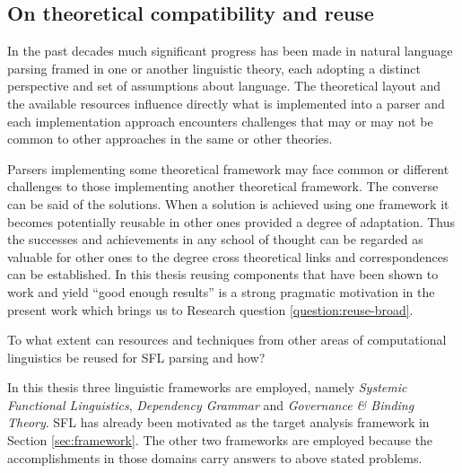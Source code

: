 
\subsection{On theoretical compatibility and reuse}
\label{sec:reuse}
In the past decades much significant progress has been made in natural language parsing framed in one or another linguistic theory, each adopting a distinct perspective and set of assumptions about language. The theoretical layout and the available resources influence directly what is implemented into a parser and each implementation approach encounters challenges that may or may not be common to other approaches in the same or other theories. 

Parsers implementing some theoretical framework may face common or different challenges to those implementing another theoretical framework. The converse can be said of the solutions. When a solution is achieved using one framework it becomes potentially reusable in other ones provided a degree of adaptation. Thus the successes and achievements in any school of thought can be regarded as valuable for other ones to the degree cross theoretical links and correspondences can be established. In this thesis reusing components that have been shown to work and yield ``good enough results'' is a strong pragmatic motivation in the present work which brings us to Research question \ref{question:reuse-broad}.

\begin{question}\label{question:reuse-broad}
    To what extent can resources and techniques from other areas of computational linguistics be reused for SFL parsing and how?
\end{question}

In this thesis three linguistic frameworks are employed, namely  \textit{Systemic Functional Linguistics}, \textit{Dependency Grammar} and \textit{Governance \& Binding Theory}. SFL has already been motivated as the target analysis framework in Section \ref{sec:framework}. The other two frameworks are employed because the accomplishments in those domains carry answers to above stated problems. %

